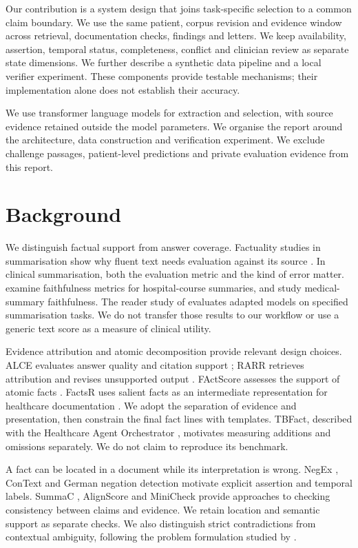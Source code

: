 \documentclass[10pt]{article}
\begin{document}
Our contribution is a system design that joins task-specific selection to a common
claim boundary. We use the same patient, corpus revision and evidence window across
retrieval, documentation checks, findings and letters. We keep availability,
assertion, temporal status, completeness, conflict and clinician review as separate
state dimensions. We further describe a synthetic data pipeline and a local verifier
experiment. These components provide testable mechanisms; their implementation alone
does not establish their accuracy.

We use transformer language models \citep{attention} for extraction and selection,
with source evidence retained outside the model parameters. We organise the report
around the architecture, data construction and verification experiment.
We exclude challenge passages, patient-level predictions
and private evaluation evidence from this report.

\section{Background}
We distinguish factual support from answer coverage. Factuality studies in
summarisation show why fluent text needs evaluation against its source
\citep{maynez,frank}. In clinical summarisation, both the evaluation metric and the
kind of error matter. \citet{adams} examine faithfulness metrics for hospital-course
summaries, and \citet{famesumm} study medical-summary faithfulness. The reader study
of \citet{vanveen} evaluates adapted models on specified summarisation tasks. We do
not transfer those results to our workflow or use a generic text score as a measure
of clinical utility.

Evidence attribution and atomic decomposition provide relevant design choices.
ALCE evaluates answer quality and citation support \citep{alce}; RARR retrieves
attribution and revises unsupported output \citep{rarr}. FActScore assesses the
support of atomic facts \citep{factscore}. FactsR uses salient facts as an
intermediate representation for healthcare documentation \citep{factsr}. We adopt
the separation of evidence and presentation, then constrain the final fact lines
with templates. TBFact, described with the Healthcare Agent Orchestrator
\citep{hao}, motivates measuring additions and omissions separately. We do not claim
to reproduce its benchmark.

A fact can be located in a document while its interpretation is wrong. NegEx
\citep{negex}, ConText \citep{context} and German negation detection
\citep{cotik} motivate explicit assertion and temporal labels. SummaC
\citep{summac}, AlignScore \citep{alignscore} and MiniCheck \citep{minicheck}
provide approaches to checking consistency between claims and evidence. We retain
location and semantic support as separate checks. We also distinguish strict
contradictions from contextual ambiguity, following the problem formulation studied
by \citet{inconsistency}.
\end{document}
